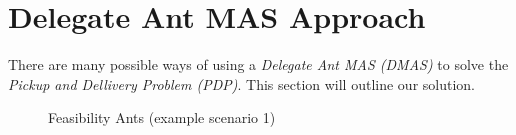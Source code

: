 \section{Delegate Ant MAS Approach}
\label{sec:dmas_algorithm}

\npar There are many possible ways of using a \textit{Delegate Ant MAS (DMAS)}
to solve the \textit{Pickup and Dellivery Problem (PDP)}. This section will
outline our solution.






\begin{figure}[!h]
        \vspace{0.5pt}
        \begin{center}
       			\setlength\fboxsep{0.5pt}
				\setlength\fboxrule{0.5pt}
		\end{center}
		\caption{Feasibility Ants (example scenario 1)}
		\label{Fig:Radios}
        \vspace{0.5pt}
\end{figure}

